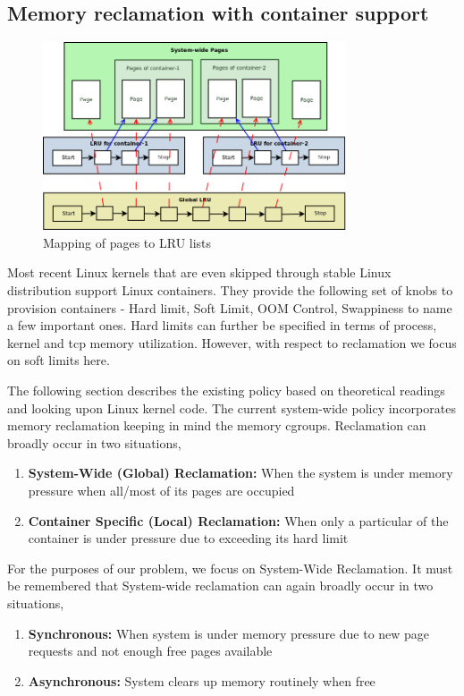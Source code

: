     \subsection{Memory reclamation with container support}
      
      \begin{figure}
	\centering
	\includegraphics[width=0.8\textwidth]{images/page_mapping.png}
	\caption{Mapping of pages to LRU lists}
	\label{img_page_mapping}
      \end{figure}
      
      Most recent Linux kernels that are even skipped through stable Linux distribution support Linux containers. They provide the 
following set of knobs to provision containers - Hard limit, Soft Limit, OOM Control, Swappiness to name a few important ones. Hard limits 
can further be specified in terms of process, kernel and tcp memory utilization. However, with respect to reclamation we focus on soft 
limits here.
    
      The following section describes the existing policy based on theoretical readings and looking upon Linux kernel code. The current 
system-wide policy incorporates memory reclamation keeping in mind the memory cgroups. Reclamation can broadly occur in two situations,
      \begin{enumerate}
	\item \textbf{System-Wide (Global) Reclamation:} When the system is under memory pressure when all/most of its pages are occupied
	\item \textbf{Container Specific (Local) Reclamation:} When only a particular of the container is under pressure due to exceeding 
its hard limit
      \end{enumerate}
      
      For the purposes of our problem, we focus on System-Wide Reclamation. It must be remembered that System-wide reclamation can again 
broadly occur in two situations,       
      \begin{enumerate}
	\item \textbf{Synchronous:} When system is under memory pressure due to new page requests and not enough free pages available
	\item \textbf{Asynchronous:} System clears up memory routinely when free
      \end{enumerate}         
      
